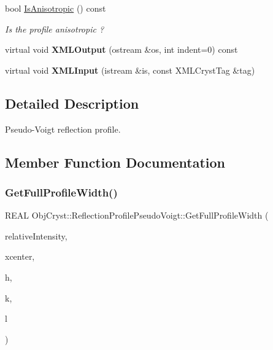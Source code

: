 \begin{DoxyCompactItemize}
bool \mbox{\hyperlink{class_obj_cryst_1_1_reflection_profile_pseudo_voigt_acc84f44528014542fa395352edad6079}{Is\+Anisotropic}} () const
\begin{DoxyCompactList}\small\item\em Is the profile anisotropic ? \end{DoxyCompactList}\item 
\mbox{\label{class_obj_cryst_1_1_reflection_profile_pseudo_voigt_a1c93a0c50f14366362b531baa65332d9}} 
virtual void {\bfseries X\+M\+L\+Output} (ostream \&os, int indent=0) const
\item 
\mbox{\label{class_obj_cryst_1_1_reflection_profile_pseudo_voigt_adc59b6a42dbf81ecf2fe23b178eb607e}} 
virtual void {\bfseries X\+M\+L\+Input} (istream \&is, const X\+M\+L\+Cryst\+Tag \&tag)
\end{DoxyCompactItemize}


\subsection{Detailed Description}
Pseudo-\/\+Voigt reflection profile. 

\subsection{Member Function Documentation}
\mbox{\label{class_obj_cryst_1_1_reflection_profile_pseudo_voigt_aab311ae897daf5e738eb7727e57fd0c7}} 
\subsubsection{\texorpdfstring{GetFullProfileWidth()}{GetFullProfileWidth()}}
{\footnotesize\ttfamily R\+E\+AL Obj\+Cryst\+::\+Reflection\+Profile\+Pseudo\+Voigt\+::\+Get\+Full\+Profile\+Width (\begin{DoxyParamCaption}\item[{const R\+E\+AL}]{relative\+Intensity,  }\item[{const R\+E\+AL}]{xcenter,  }\item[{const R\+E\+AL}]{h,  }\item[{const R\+E\+AL}]{k,  }\item[{const R\+E\+AL}]{l }\end{DoxyParamCaption})\hspace{0.3cm}{\ttfamily [virtual]}}


